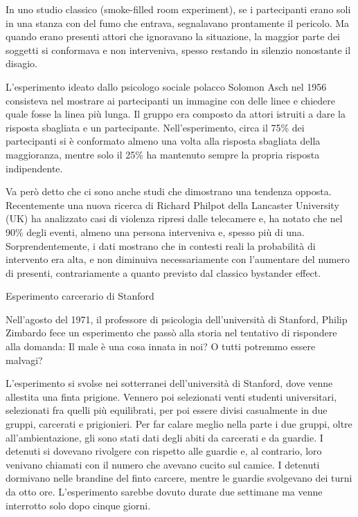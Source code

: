 \documentclass[12pt]{book} %
\begin{document}
\begin{mdframed}[linewidth=1pt]
In uno studio classico (smoke-filled room experiment), se i partecipanti erano soli in una stanza con del fumo che entrava, segnalavano prontamente il pericolo. Ma quando erano presenti attori che ignoravano la situazione, la maggior parte dei soggetti si conformava e non interveniva, spesso restando in silenzio nonostante il disagio.

L'esperimento ideato dallo psicologo sociale polacco Solomon Asch nel 1956 consisteva nel mostrare ai partecipanti un
immagine con delle linee e chiedere quale fosse la linea più lunga. Il gruppo era composto da attori istruiti a dare la
risposta sbagliata e un partecipante. Nell'esperimento, circa il 75\% dei partecipanti si è conformato almeno una volta alla risposta sbagliata della maggioranza, mentre solo il 25\% ha mantenuto sempre la propria risposta indipendente.

Va però detto che ci sono anche studi che dimostrano una tendenza opposta. Recentemente una nuova ricerca di Richard
Philpot della Lancaster University (UK) ha analizzato casi di violenza ripresi dalle telecamere e, ha notato che nel
90\% degli eventi, almeno una persona interveniva e, spesso più di una. Sorprendentemente, i dati mostrano che in contesti reali la probabilità di intervento era alta, e non diminuiva necessariamente con l’aumentare del numero di presenti, contrariamente a quanto previsto dal classico bystander effect.

Esperimento carcerario di Stanford 

Nell'agosto del 1971, il professore di psicologia dell'università di Stanford,
Philip Zimbardo fece un esperimento che passò alla storia nel tentativo di rispondere alla domanda: Il male è una cosa
innata in noi? O tutti potremmo essere malvagi?

L'esperimento si svolse nei sotterranei dell'università di Stanford, dove
venne allestita una finta prigione. Vennero poi selezionati venti studenti universitari, selezionati fra quelli più
equilibrati, per poi essere divisi casualmente in due gruppi, carcerati e prigionieri. Per far calare meglio nella
parte i due gruppi, oltre all'ambientazione, gli sono stati dati degli abiti da carcerati e da
guardie. I detenuti si dovevano rivolgere con rispetto alle guardie e, al contrario, loro venivano chiamati con il numero
che avevano cucito sul camice. I detenuti dormivano nelle brandine del finto carcere, mentre le guardie svolgevano dei
turni da otto ore. L'esperimento sarebbe dovuto durate due settimane ma venne interrotto solo dopo
cinque giorni.


\end{mdframed}
\end{document}
